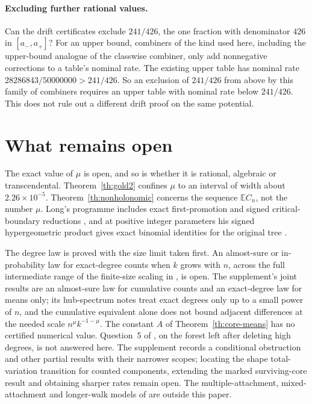 \documentclass[11pt]{article}
\theoremstyle{remark}
\newcommand{\E}{\mathbb E}
\begin{document}
\paragraph{Excluding further rational values.} Can the drift certificates exclude $241/426$, the one fraction with denominator $426$ in $[a_-,a_+]$? For an upper bound, combiners of the kind used here, including the upper-bound analogue of the classwise combiner, only add nonnegative corrections to a table's nominal rate. The existing upper table has nominal rate $28286843/50000000>241/426$. So an exclusion of $241/426$ from above by this family of combiners requires an upper table with nominal rate below $241/426$. This does not rule out a different drift proof on the same potential.

\section{What remains open}\label{sec:open}
The exact value of $\mu$ is open, and so is whether it is rational, algebraic or transcendental. Theorem~\ref{th:gold2} confines $\mu$ to an interval of width about $2.26\times10^{-5}$. Theorem~\ref{th:nonholonomic} concerns the sequence $\E C_n$, not the number $\mu$. Long's programme includes exact first-promotion and signed critical-boundary reductions \cite{LongMean}, and at positive integer parameters his signed hypergeometric product gives exact binomial identities for the original tree \cite{LongProduct}.

The degree law is proved with the size limit taken first. An almost-sure or in-probability law for exact-degree counts when $k$ grows with $n$, across the full intermediate range of the finite-size scaling in \cite[Eq.~(1) and Sec.~5.1]{KR}, is open. The supplement's joint results are an almost-sure law for cumulative counts and an exact-degree law for means only; its hub-spectrum notes treat exact degrees only up to a small power of $n$, and the cumulative equivalent alone does not bound adjacent differences at the needed scale $n^\mu k^{-1-\mu}$. The constant $A$ of Theorem~\ref{th:core-means} has no certified numerical value. Question~5 of \cite[Sec.~7]{AB}, on the forest left after deleting high degrees, is not answered here. The supplement records a conditional obstruction and other partial results with their narrower scopes; locating the shape total-variation transition for counted components, extending the marked surviving-core result and obtaining sharper rates remain open. The multiple-attachment, mixed-attachment and longer-walk models of \cite[Sec.~7(6)--(8)]{AB} are outside this paper.
\end{document}
